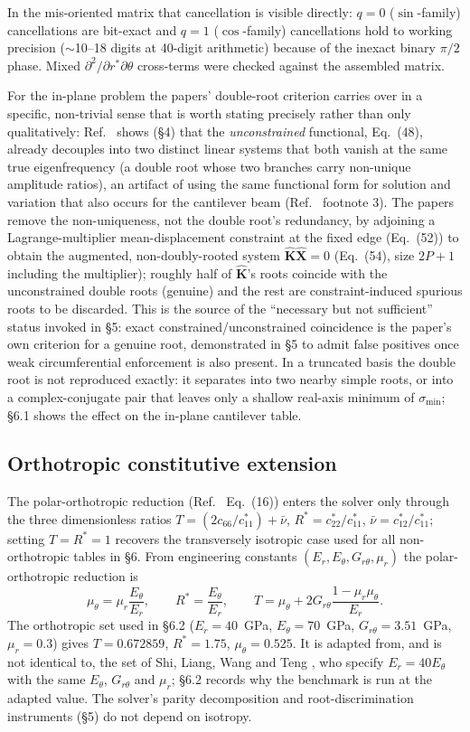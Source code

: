\documentclass[11pt]{article}
\begin{document}
In the mis-oriented matrix that cancellation is visible directly: $q=0$
($\sin$-family) cancellations are bit-exact and $q=1$ ($\cos$-family)
cancellations hold to working precision
(\hbox{$\sim$10--18} digits at 40-digit arithmetic) because of the inexact
binary $\pi/2$ phase. Mixed $\partial^2/\partial r^{*}\partial\theta$
cross-terms were checked against the assembled matrix.

For the in-plane problem the papers' double-root criterion carries over
in a specific, non-trivial sense that is worth stating precisely rather
than only qualitatively: Ref.~\cite{seok2} shows (\S4) that the
\emph{unconstrained} functional, Eq.~(48), already decouples into two
distinct linear systems that both vanish at the same true eigenfrequency
(a double root whose two branches carry non-unique amplitude ratios),
an artifact of using the same functional form for solution and variation
that also occurs for the cantilever beam (Ref.~\cite{seok2} footnote 3).
The papers remove the non-uniqueness, not the double root's redundancy,
by adjoining a Lagrange-multiplier mean-displacement constraint at the
fixed edge (Eq.~(52)) to obtain the augmented, non-doubly-rooted system
$\hat{\mathbf K}\hat{\mathbf X}=0$ (Eq.~(54), size $2P+1$ including the
multiplier); roughly half of $\hat{\mathbf K}$'s roots coincide with the
unconstrained double roots (genuine) and the rest are constraint-induced
spurious roots to be discarded. This is the source of the ``necessary but
not sufficient'' status invoked in \S5: exact constrained/unconstrained
coincidence is the paper's own criterion for a genuine root, demonstrated
in \S5 to admit false positives once weak circumferential enforcement is
also present. In a truncated basis the double root is not reproduced exactly:
it separates into two nearby simple roots, or into a complex-conjugate
pair that leaves only a shallow real-axis minimum of $\sigma_{\min}$;
\S6.1 shows the effect on the in-plane cantilever table.

\subsection{Orthotropic constitutive extension}\label{sec:ortho}
The polar-orthotropic reduction (Ref.~\cite{seok1} Eq.~(16)) enters the
solver only through the three dimensionless ratios $T=(2c_{66}/c^{*}_{11})
+\bar\nu$, $R^{*}=c^{*}_{22}/c^{*}_{11}$, $\bar\nu=c^{*}_{12}/c^{*}_{11}$;
setting $T=R^{*}=1$ recovers the transversely isotropic case used for all
non-orthotropic tables in \S6. From engineering constants
$(E_r,E_\theta,G_{r\theta},\mu_r)$ the polar-orthotropic reduction is
\[
\mu_\theta=\mu_r\frac{E_\theta}{E_r},\qquad
R^{*}=\frac{E_\theta}{E_r},\qquad
T=\mu_\theta+2G_{r\theta}\frac{1-\mu_r\mu_\theta}{E_r}.
\]
The orthotropic set used in \S6.2
($E_r=40$~GPa, $E_\theta=70$~GPa, $G_{r\theta}=3.51$~GPa, $\mu_r=0.3$)
gives $T=0.672859$, $R^{*}=1.75$, $\mu_\theta=0.525$. It is adapted from,
and is not identical to, the set of Shi, Liang, Wang and Teng
\cite{shi2016}, who specify $E_r=40E_\theta$ with the same $E_\theta$,
$G_{r\theta}$ and $\mu_r$; \S6.2 records why the benchmark is run at the
adapted value. The solver's
parity decomposition and root-discrimination instruments (\S5) do not
depend on isotropy.
\end{document}
